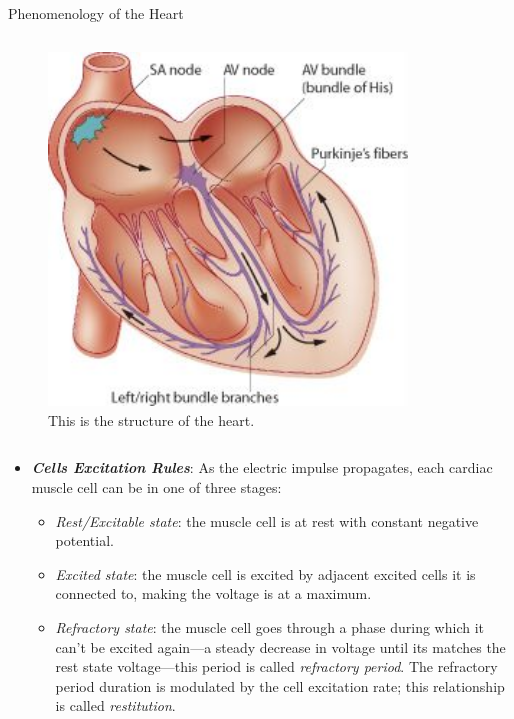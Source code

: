 \documentclass[final,hyperref={pdfpagelabels=false}]{beamer}
\begin{document}
\begin{frame}[t]
\begin{columns}[t]
\begin{column}{.465\textwidth}
\begin{block}{Phenomenology of the Heart}
\begin{columns}
\begin{column}{.43\textwidth}
	\begin{figure}
	
	
	\includegraphics[width=0.85\textwidth]{heart}
	\caption{\label{fig:heart}This is the structure of the heart.}
	\end{figure}
\end{column}
\end{columns}
\begin{itemize}

	\item \textbf{ \textit{Cells Excitation Rules}}: As the electric impulse propagates, each cardiac muscle cell can be in one of three stages:

		\begin{itemize}
 		 \item \textit{Rest/Excitable state}: the muscle cell is at rest with constant negative potential.								
  		\item \textit{Excited state}: the muscle cell is excited by adjacent excited cells it is connected to, making the voltage is at a maximum. 
  		\item \textit{Refractory state}: the muscle cell goes through a phase during which it can't be excited again---a steady decrease in voltage until its matches the rest state voltage---this period is called \textit{refractory period}. The refractory period duration is modulated by the cell excitation rate; this relationship is called \textit{restitution}.
		\end{itemize}  


\end{itemize}
\end{block}
\end{column}
\end{columns}
\end{frame}
\end{document}
